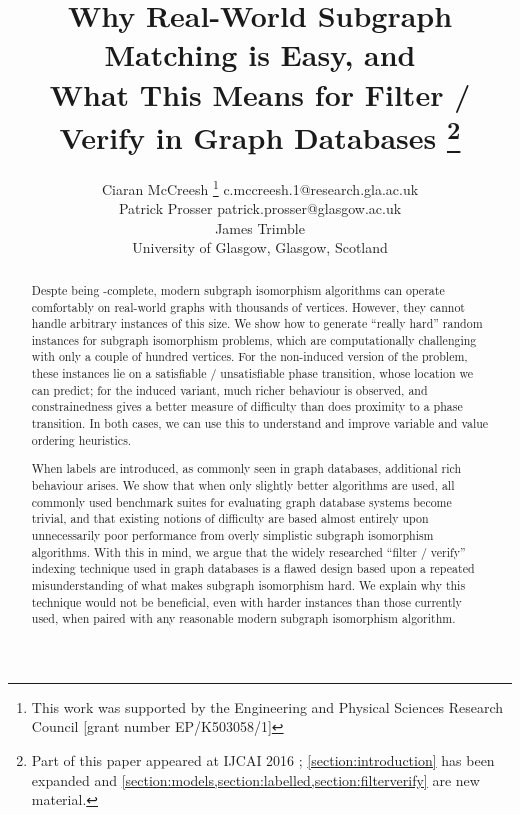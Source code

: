 \documentclass[twoside,11pt]{article}
\newcommand{\citep}[1]{\cite{#1}}
\begin{document}
\title{Why Real-World Subgraph Matching is Easy, and \\ What This Means for Filter / Verify in
Graph Databases \thanks{Part of this paper appeared at IJCAI 2016
\citep{DBLP:conf/ijcai/McCreeshPT16}; \cref{section:introduction} has been expanded and
\cref{section:models,section:labelled,section:filterverify} are new material.}}

\author{\name Ciaran McCreesh \thanks{This work was supported by the Engineering and Physical Sciences
            Research Council [grant number EP/K503058/1]} \email c.mccreesh.1@research.gla.ac.uk \\
       \name Patrick Prosser \email patrick.prosser@glasgow.ac.uk \\
       \name James Trimble \\
   \addr University of Glasgow, Glasgow, Scotland}
\maketitle

\begin{abstract}
    Despte being \NP-complete, modern subgraph isomorphism algorithms can operate comfortably on
    real-world graphs with thousands of vertices. However, they cannot handle arbitrary instances of
    this size. We show how to generate ``really hard'' random instances for subgraph isomorphism
    problems, which are computationally challenging with only a couple of hundred vertices. For the
    non-induced version of the problem, these instances lie on a satisfiable / unsatisfiable phase
    transition, whose location we can predict; for the induced variant, much richer behaviour is
    observed, and constrainedness gives a better measure of difficulty than does proximity to a
    phase transition. In both cases, we can use this to understand and improve variable and value
    ordering heuristics.

    When labels are introduced, as commonly seen in graph databases, additional rich behaviour
    arises.  We show that when only slightly better algorithms are used, all commonly used benchmark
    suites for evaluating graph database systems become trivial, and that existing notions of
    difficulty are based almost entirely upon unnecessarily poor performance from overly simplistic
    subgraph isomorphism algorithms. With this in mind, we argue that the widely researched ``filter
    / verify'' indexing technique used in graph databases is a flawed design based upon a repeated
    misunderstanding of what makes subgraph isomorphism hard. We explain why this technique would
    not be beneficial, even with harder instances than those currently used, when paired with any
    reasonable modern subgraph isomorphism algorithm.
\end{abstract}
\end{document}
